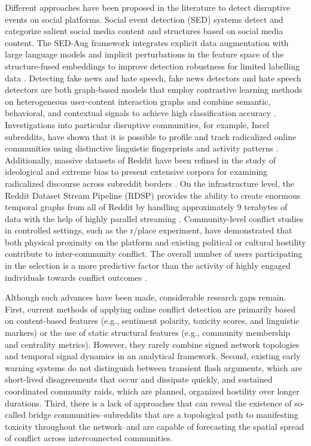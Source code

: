 \documentclass[a4paper,fleqn]{cas-dc}
\begin{document}
Different approaches have been proposed in the literature to detect disruptive events on social platforms. Social event detection (SED) systems detect and categorize salient social media content and structures based on social media content. The SED-Aug framework integrates explicit data augmentation with large language models and implicit perturbations in the feature space of the structure-fused embeddings to improve detection robustness for limited labelling data \cite{8_ma2025}. Detecting fake news and hate speech, fake news detectors and hate speech detectors are both graph-based models that employ contrastive learning methods on heterogeneous user-content interaction graphs and combine semantic, behavioral, and contextual signals to achieve high classification accuracy \cite{11_Nivedita2025}. Investigations into particular disruptive communities, for example, Incel subreddits, have shown that it is possible to profile and track radicalized online communities using distinctive linguistic fingerprints and activity patterns \cite{9_Gothard2020}. Additionally, massive datasets of Reddit have been refined in the study of ideological and extreme bias to present extensive corpora for examining radicalized discourse across subreddit borders \cite{4_Ravi2024}. On the infrastructure level, the Reddit Dataset Stream Pipeline (RDSP) provides the ability to create enormous temporal graphs from all of Reddit by handling approximately 9 terabytes of data with the help of highly parallel streaming \cite{5_Huber2022}. Community-level conflict studies in controlled settings, such as the r/place experiment, have demonstrated that both physical proximity on the platform and existing political or cultural hostility contribute to inter-community conflict. The overall number of users participating in the selection is a more predictive factor than the activity of highly engaged individuals towards conflict outcomes \cite{3_Vachher2020}.

Although such advances have been made, considerable research gaps remain. First, current methods of applying online conflict detection are primarily based on content-based features (e.g., sentiment polarity, toxicity scores, and linguistic markers) or the use of static structural features (e.g., community membership and centrality metrics). However, they rarely combine signed network topologies and temporal signal dynamics in an analytical framework. Second, existing early warning systems do not distinguish between transient flash arguments, which are short-lived disagreements that occur and dissipate quickly, and sustained coordinated community raids, which are planned, organized hostility over longer durations. Third, there is a lack of approaches that can reveal the existence of so-called bridge communities–subreddits that are a topological path to manifesting toxicity throughout the network–and are capable of forecasting the spatial spread of conflict across interconnected communities.
\end{document}
